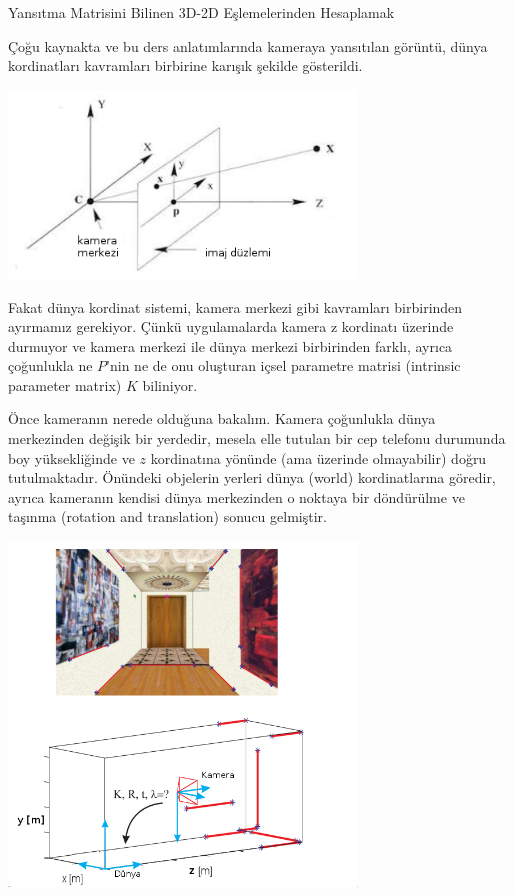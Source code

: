 \documentclass[12pt,fleqn]{article}\usepackage{../../common}
\begin{document}
Yansıtma Matrisini Bilinen 3D-2D Eşlemelerinden Hesaplamak

Çoğu kaynakta ve bu ders anlatımlarında kameraya yansıtılan görüntü, dünya
kordinatları kavramları birbirine karışık şekilde gösterildi.

\includegraphics[width=25em]{vision_055_02.png}

Fakat dünya kordinat sistemi, kamera merkezi gibi kavramları birbirinden
ayırmamız gerekiyor. Çünkü uygulamalarda kamera z kordinatı üzerinde
durmuyor ve kamera merkezi ile dünya merkezi birbirinden farklı, ayrıca
çoğunlukla ne $P$'nin ne de onu oluşturan içsel parametre matrisi
(intrinsic parameter matrix) $K$ biliniyor.

Önce kameranın nerede olduğuna bakalım. Kamera çoğunlukla dünya merkezinden
değişik bir yerdedir, mesela elle tutulan bir cep telefonu durumunda boy
yüksekliğinde ve $z$ kordinatına yönünde (ama üzerinde olmayabilir) doğru
tutulmaktadır. Önündeki objelerin yerleri dünya (world) kordinatlarına
göredir, ayrıca kameranın kendisi dünya merkezinden o noktaya bir
döndürülme ve taşınma (rotation and translation) sonucu gelmiştir.

\includegraphics[width=25em]{vision_055_01.png}
\end{document}
